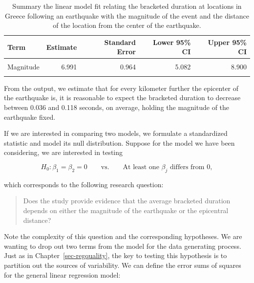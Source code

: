 \documentclass[
  letterpaper,
  DIV=11,
  numbers=noendperiod]{scrreprt}
\theoremstyle{definition}
\theoremstyle{definition}
\theoremstyle{plain}
\theoremstyle{remark}
\begin{document}
\hypertarget{tbl-regextensions-ci}{}
\begin{table}
\caption{\label{tbl-regextensions-ci}Summary the linear model fit relating the bracketed duration at
locations in Greece following an earthquake with the magnitude of the
event and the distance of the location from the center of the
earthquake. }\tabularnewline

\centering
\begin{tabular}[t]{lrrrr}
\toprule
Term & Estimate & Standard Error & Lower 95\% CI & Upper 95\% CI\\
\midrule
\cellcolor{gray!6}{(Intercept)} & \cellcolor{gray!6}{-30.715} & \cellcolor{gray!6}{4.887} & \cellcolor{gray!6}{-40.395} & \cellcolor{gray!6}{-21.036}\\
Magnitude & 6.991 & 0.964 & 5.082 & 8.900\\
\cellcolor{gray!6}{Epicentral Distance} & \cellcolor{gray!6}{-0.077} & \cellcolor{gray!6}{0.021} & \cellcolor{gray!6}{-0.118} & \cellcolor{gray!6}{-0.036}\\
\bottomrule
\end{tabular}
\end{table}

From the output, we estimate that for every kilometer further the
epicenter of the earthquake is, it is reasonable to expect the bracketed
duration to decrease between 0.036 and 0.118 seconds, on average,
holding the magnitude of the earthquake fixed.

If we are interested in comparing two models, we formulate a
standardized statistic and model its null distribution. Suppose for the
model we have been considering, we are interested in testing

\[H_0: \beta_1 = \beta_2 = 0 \qquad \text{vs.} \qquad \text{At least one } \beta_j \text{ differs from 0},\]

which corresponds to the following research question:

\begin{quote}
Does the study provide evidence that the average bracketed duration
depends on either the magnitude of the earthquake or the epicentral
distance?
\end{quote}

Note the complexity of this question and the corresponding hypotheses.
We are wanting to drop out two terms from the model for the data
generating process. Just as in Chapter~\ref{sec-regquality}, the key to
testing this hypothesis is to partition out the sources of variability.
We can define the error sums of squares for the general linear
regression model:
\end{document}

